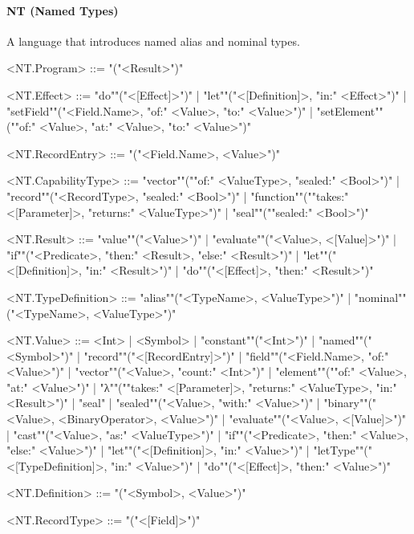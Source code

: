 \documentclass[main.tex]{subfiles}
\begin{document}
\paragraph{ NT (Named Types) } A language that introduces named alias and nominal types.
\begin{grammar}
	\footnotesize
				<NT.Program> ::=
							"("<Result>")"
				\par
				<NT.Effect> ::=
						"do""("<[Effect]>")"
						| "let""("<[Definition]>, "in:" <Effect>")"
						| "setField""("<Field.Name>, "of:" <Value>, "to:" <Value>")"
						| "setElement""(""of:" <Value>, "at:" <Value>, "to:" <Value>")"
				\par
				<NT.RecordEntry> ::=
							"("<Field.Name>, <Value>")"
				\par
				<NT.CapabilityType> ::=
						"vector""(""of:" <ValueType>, "sealed:" <Bool>")"
						| "record""("<RecordType>, "sealed:" <Bool>")"
						| "function""(""takes:" <[Parameter]>, "returns:" <ValueType>")"
						| "seal""(""sealed:" <Bool>")"
				\par
				<NT.Result> ::=
						"value""("<Value>")"
						| "evaluate""("<Value>, <[Value]>")"
						| "if""("<Predicate>, "then:" <Result>, "else:" <Result>")"
						| "let""("<[Definition]>, "in:" <Result>")"
						| "do""("<[Effect]>, "then:" <Result>")"
				\par
				<NT.TypeDefinition> ::=
						"alias""("<TypeName>, <ValueType>")"
						| "nominal""("<TypeName>, <ValueType>")"
				\par
				<NT.Value> ::=
						<Int> |
								<Symbol> |
						"constant""("<Int>")"
						| "named""("<Symbol>")"
						| "record""("<[RecordEntry]>")"
						| "field""("<Field.Name>, "of:" <Value>")"
						| "vector""("<Value>, "count:" <Int>")"
						| "element""(""of:" <Value>, "at:" <Value>")"
						| "λ""(""takes:" <[Parameter]>, "returns:" <ValueType>, "in:" <Result>")"
						| "seal"
						| "sealed""("<Value>, "with:" <Value>")"
						| "binary""("<Value>, <BinaryOperator>, <Value>")"
						| "evaluate""("<Value>, <[Value]>")"
						| "cast""("<Value>, "as:" <ValueType>")"
						| "if""("<Predicate>, "then:" <Value>, "else:" <Value>")"
						| "let""("<[Definition]>, "in:" <Value>")"
						| "letType""("<[TypeDefinition]>, "in:" <Value>")"
						| "do""("<[Effect]>, "then:" <Value>")"
				\par
				<NT.Definition> ::=
							"("<Symbol>, <Value>")"
				\par
				<NT.RecordType> ::=
							"("<[Field]>")"
				\par

\end{grammar}
\end{document}
